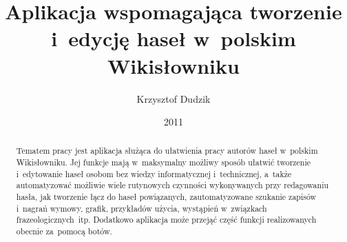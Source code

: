 \documentclass{pracamgr}
\author{Krzysztof Dudzik}
\title{Aplikacja wspomagająca tworzenie i~edycję haseł w~polskim Wikisłowniku}
\date{2011}
\begin{document}
\maketitle

\begin{abstract}
  Tematem pracy jest aplikacja służąca do ułatwienia pracy autorów haseł w~polskim Wikisłowniku. Jej funkcje mają w~maksymalny możliwy sposób ułatwić tworzenie i~edytowanie haseł osobom bez wiedzy informatycznej i~technicznej, a~także automatyzować możliwie wiele rutynowych czynności wykonywanych przy redagowaniu hasła, jak tworzenie łącz do haseł powiązanych, zautomatyzowane szukanie zapisów i~nagrań wymowy, grafik, przykładów użycia, wystąpień w~związkach frazeologicznych~itp. Dodatkowo aplikacja może przejąć część funkcji realizowanych obecnie za~pomocą botów.
\end{abstract}

\tableofcontents
\end{document}
